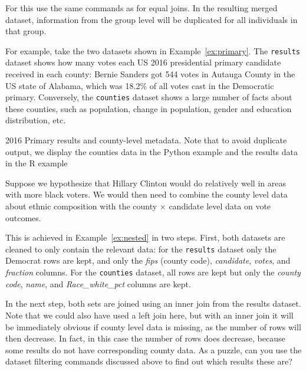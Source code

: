 For this use the same commands as for equal joins.
In the resulting merged dataset, information from the group level will be duplicated for all individuals in that group.

For example, take the two datasets shown in Example~\ref{ex:primary}.
The \texttt{results} dataset shows how many votes each US 2016 presidential primary candidate received in each county:
Bernie Sanders got 544 votes in Autauga County in the US state of Alabama, which was 18.2\% of all votes cast in the
Democratic primary.
Conversely, the \texttt{counties} dataset shows a large number of facts about these counties,
such as population, change in population, gender and education distribution, etc.

\begin{ccsexample}
  \caption{\label{ex:primary} 2016 Primary results and county-level metadata. Note that to avoid duplicate output, we display the counties data in the Python example and the results data in the R example}
\end{ccsexample}

Suppose we hypothesize that Hillary Clinton would do relatively well in areas with more black voters.
We would then need to combine the county level data about ethnic composition with the county $\times$ candidate
level data on vote outcomes.

This is achieved in Example~\ref{ex:nested} in two steps.
First, both datasets are cleaned to only contain the relevant data:
for the \texttt{results} dataset only the Democrat rows are kept, and only the \emph{fips} (county code), \emph{candidate}, \emph{votes}, and \emph{fraction} columns.
For the \texttt{counties} dataset, all rows are kept but only the \emph{county code}, \emph{name}, and \emph{Race\_white\_pct} columns are kept.


In the next step, both sets are joined using an inner join from the results dataset.
Note that we could also have used a left join here, but with an inner join it will be immediately
obvious if county level data is missing, as the number of rows will then decrease.
In fact, in this case the number of rows does decrease, because some results do not have corresponding county data.
As a puzzle, can you use the dataset filtering commands discussed above to find out which results these are?

